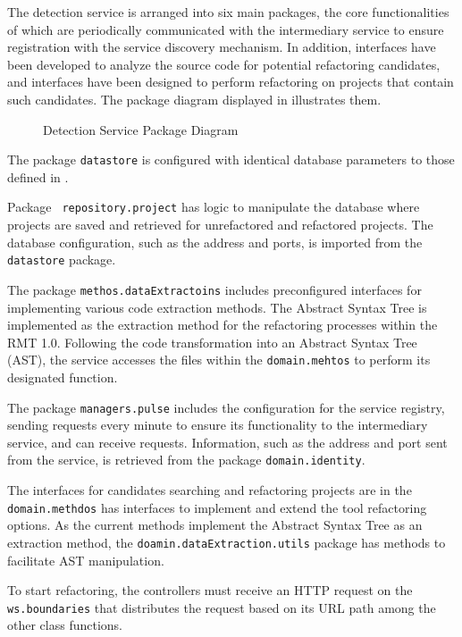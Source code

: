 The detection service is arranged into six main packages, the core functionalities of which are periodically communicated with the intermediary service to ensure registration with the service discovery mechanism. In addition, interfaces have been developed to analyze the source code for potential refactoring candidates, and interfaces have been designed to perform refactoring on projects that contain such candidates. The package diagram displayed in  illustrates them.
\begin{figure}[ht!]
\SetCaptionWidth{\textwidth}
\caption{Detection Service Package Diagram}
\label{fig-package-detection}
\fontsize{7.5}{9.5}\selectfont

\end{figure}
\FloatBarrier

The package \texttt{datastore} is configured with identical database parameters to those defined in .

Package \texttt{ repository.project} has logic to manipulate the database where projects are saved and retrieved for unrefactored and refactored projects. The database configuration, such as the address and ports, is imported from the \texttt{datastore} package.

The package \texttt{methos.dataExtractoins} includes preconfigured interfaces for implementing various code extraction methods. The Abstract Syntax Tree is implemented as the extraction method for the refactoring processes within the RMT 1.0. Following the code transformation into an Abstract Syntax Tree (AST), the service accesses the files within the \texttt{domain.mehtos} to perform its designated function.

The package \texttt{managers.pulse} includes the configuration for the service registry, sending requests every minute to ensure its functionality to the intermediary service, and can receive requests. Information, such as the address and port sent from the service, is retrieved from the package \texttt{domain.identity}.

The interfaces for candidates searching and refactoring projects are in the \texttt{domain.methdos} has interfaces to implement and extend the tool refactoring options. As the current methods implement the Abstract Syntax Tree as an extraction method, the \texttt{doamin.dataExtraction.utils} package has methods to facilitate AST manipulation.

To start refactoring, the controllers must receive an HTTP request on the \texttt{ws.boundaries} that distributes the request based on its URL path among the other class functions. 


